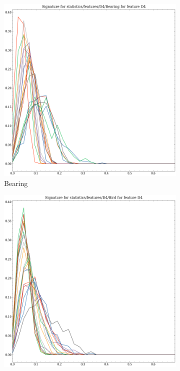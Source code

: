 \begin{figure}[t!p]
    \begin{subfigure}[b]{0.23\textwidth}
        \includegraphics[width=\textwidth]{assets/feature_extraction/D4/Bearing.png}
        \caption{Bearing}
    \end{subfigure}
    \hfill
    \begin{subfigure}[b]{0.23\textwidth}
        \includegraphics[width=\textwidth]{assets/feature_extraction/D4/Bird.png}

\end{subfigure}
\end{figure}
